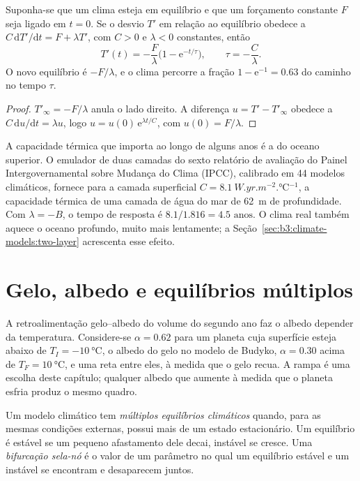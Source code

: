 \begin{theorem}\label{thm:b3:climate-models:response}
Suponha-se que um clima esteja em equilíbrio e que um forçamento constante $F$ seja
ligado em $t = 0$. Se o desvio $T'$ em relação ao equilíbrio obedece a $C\,\mathrm
dT'/\mathrm dt = F + \lambda T'$, com $C > 0$ e $\lambda < 0$ constantes,
então
\[
T'(t) = -\frac{F}{\lambda}\Big(1 - \mathrm e^{-t/\tau}\Big), \qquad
\tau = -\frac{C}{\lambda} .
\]
O novo equilíbrio é $-F/\lambda$, e o clima percorre a fração $1
- \mathrm e^{-1} = \num{0.63}$ do caminho no tempo $\tau$.
\end{theorem}

\begin{proof}
$T'_\infty = -F/\lambda$ anula o lado direito. A diferença
$u = T' - T'_\infty$ obedece a $C\,\mathrm du/\mathrm dt = \lambda u$, logo $u =
u(0)\,\mathrm e^{\lambda t/C}$, com $u(0) = F/\lambda$.
\end{proof}

A capacidade térmica que importa ao longo de alguns anos é a do oceano superior.
O emulador de duas camadas do sexto relatório de avaliação do
Painel Intergovernamental sobre Mudança do Clima (IPCC), calibrado em 44 modelos climáticos,
fornece para a camada superficial $C = \qty{8.1}{W.yr.m^{-2}.\celsius^{-1}}$, a capacidade térmica
de uma camada de água do mar de \qty{62}{m} de profundidade. Com $\lambda = -B$, o
tempo de resposta é $8.1/1.816 = \num{4.5}\text{ anos}$. O clima real também aquece
o oceano profundo, muito mais lentamente; a Seção~\ref{sec:b3:climate-models:two-layer}
acrescenta esse efeito.

\section{Gelo, albedo e equilíbrios múltiplos}\label{sec:b3:climate-models:multiple}

A retroalimentação gelo--albedo do volume do segundo ano faz o albedo depender da
temperatura. Considere-se $\alpha = 0.62$ para um planeta cuja superfície esteja abaixo de
$T_I = \qty{-10}{\celsius}$, o albedo do gelo no modelo de Budyko, $\alpha
= 0.30$ acima de $T_F = \qty{+10}{\celsius}$, e uma reta entre eles, à medida que
o gelo recua. A rampa é uma escolha deste capítulo; qualquer albedo que
aumente à medida que o planeta esfria produz o mesmo quadro.

\begin{definition}\label{def:b3:climate-models:multiple-equilibria}
Um modelo climático tem \emph{múltiplos equilíbrios climáticos}
quando, para as mesmas condições externas, possui mais de
um estado estacionário. Um equilíbrio é estável se um pequeno afastamento
dele decai, instável se cresce. Uma \emph{bifurcação
sela-nó} é o valor de um parâmetro no qual
um equilíbrio estável e um instável se encontram e desaparecem juntos.
\end{definition}

